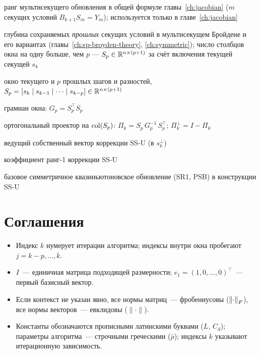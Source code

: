 \begin{description}[leftmargin=5.5em,labelwidth=5em,labelindent=0pt,font=\normalfont]
  \item[$m$]           ранг мультисекущего обновления в общей формуле
                        главы~\ref{ch:jacobian} ($m$ секущих условий
                        $B_{k+1} S_m = Y_m$); используется только
                        в главе~\ref{ch:jacobian}
  \item[$p$]           глубина сохраняемых \emph{прошлых} секущих условий
                        в мультисекущем Бройдене и его вариантах
                        (главы~\ref{ch:sp-broyden-theory},
                        \ref{ch:symmetric}); число столбцов окна на одну
                        больше, чем $p$ --- $S_p \in \mathbb{R}^{n\times (p+1)}$
                        за счёт включения текущей секущей $s_k$
  \item[$S_p,\, Y_p$]  окно текущего и $p$ прошлых шагов и разностей,
                        $S_p = [s_k\mid s_{k-1}\mid\cdots\mid s_{k-p}]
                        \in \mathbb{R}^{n\times(p+1)}$
  \item[$G_p$]         грамиан окна: $G_p = S_p^\top S_p$
  \item[$\Pi_k$]       ортогональный проектор на $\operatorname{col}(S_p)$:
                        $\Pi_k = S_p\,G_p^{-1}\,S_p^\top$;
                        $\Pi_k^{\perp} = I - \Pi_k$
  \item[$u_k^*$]       ведущий собственный вектор коррекции SS-U
                        (в $s_k^{\perp}$)
  \item[$\sigma_k^*$]  коэффициент ранг-1 коррекции SS-U
  \item[$\mathcal{U}$] базовое симметричное квазиньютоновское обновление
                        (SR1, PSB) в конструкции SS-U
\end{description}

\section*{Соглашения}

\begin{itemize}[leftmargin=*]
  \item Индекс $k$ нумерует итерации алгоритма;
        индексы внутри окна пробегают $j = k-p,\ldots,k$.
  \item $I$~--- единичная матрица подходящей размерности;
        $e_1 = (1,0,\ldots,0)^\top$~--- первый базисный вектор.
  \item Если контекст не указан явно, все нормы матриц~--- фробениусовы
        ($\left\|\cdot\right\|_F$), все нормы векторов~--- евклидовы ($\|\cdot\|$).
  \item Константы обозначаются прописными латинскими буквами
        ($L,\, C_d$); параметры алгоритма~---
        строчными греческими ($\bar{\rho}$);
        индексы $k$ указывают итерационную зависимость.
\end{itemize}
